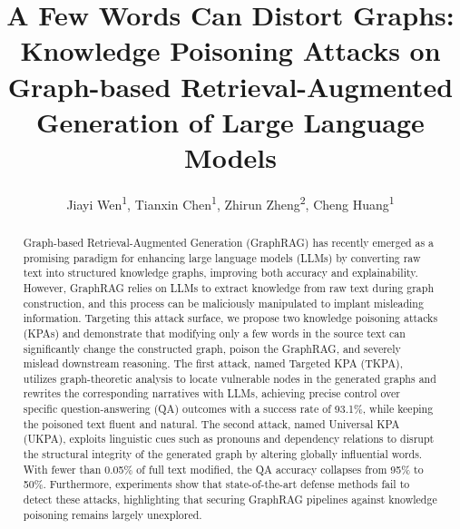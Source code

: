 \documentclass[letterpaper]{article} %
\title{A Few Words Can Distort Graphs: Knowledge Poisoning Attacks on Graph-based Retrieval-Augmented Generation of Large Language Models}
\author{
    Jiayi Wen\textsuperscript{\rm 1},
    Tianxin Chen\textsuperscript{\rm 1},
    Zhirun Zheng\textsuperscript{\rm 2},
    Cheng Huang\textsuperscript{\rm 1}
}
\begin{document}
\maketitle

\begin{abstract}
Graph-based Retrieval-Augmented Generation (GraphRAG) has recently emerged as a promising paradigm for enhancing large language models (LLMs) by converting raw text into structured knowledge graphs, improving both accuracy and explainability.
However, GraphRAG relies on LLMs to extract knowledge from raw text during graph construction, and this process can be maliciously manipulated to implant misleading information. 
Targeting this attack surface, we propose two knowledge poisoning attacks (KPAs) and demonstrate that modifying only a few words in the source text can significantly change the constructed graph, poison the GraphRAG, and severely mislead downstream reasoning.
The first attack, named Targeted KPA (TKPA), utilizes graph-theoretic analysis to locate vulnerable nodes in the generated graphs and rewrites the corresponding narratives with LLMs, achieving precise control over specific question-answering (QA) outcomes with a success rate of 93.1\%, while keeping the poisoned text fluent and natural.
The second attack, named Universal KPA (UKPA), exploits linguistic cues such as pronouns and dependency relations to disrupt the structural integrity of the generated graph by altering globally influential words. With fewer than 0.05\% of full text modified, the QA accuracy collapses from 95\% to 50\%.
Furthermore, experiments show that state-of-the-art defense methods fail to detect these attacks, highlighting that securing GraphRAG pipelines against knowledge poisoning remains largely unexplored.


\end{abstract}
\end{document}
